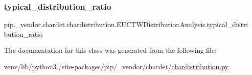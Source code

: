 \subsubsection{\texorpdfstring{typical\+\_\+distribution\+\_\+ratio}{typical\_distribution\_ratio}}
{\footnotesize\ttfamily pip.\+\_\+vendor.\+chardet.\+chardistribution.\+E\+U\+C\+T\+W\+Distribution\+Analysis.\+typical\+\_\+distribution\+\_\+ratio}



The documentation for this class was generated from the following file\+:\begin{DoxyCompactItemize}
\item 
venv/lib/python3./site-\/packages/pip/\+\_\+vendor/chardet/\hyperlink{chardistribution_8py}{chardistribution.\+py}\end{DoxyCompactItemize}
